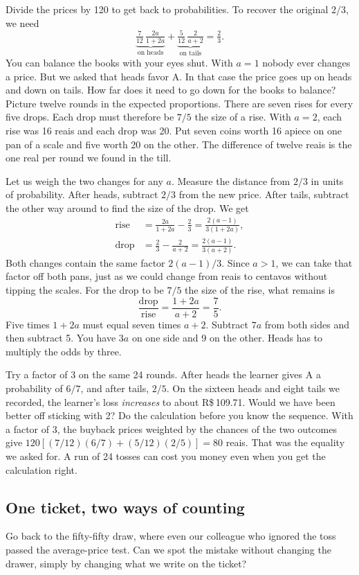\documentclass[12pt,oneside]{article}
\newcommand{\secao}[1]{\Needspace{5.2\baselineskip}\subsection*{#1}}
\begin{document}
Divide the prices by 120 to get back to probabilities. To recover the original $2/3$, we need
\[
\underbrace{\tfrac{7}{12}\,\tfrac{2a}{1+2a}}_{\text{on heads}}
+\underbrace{\tfrac{5}{12}\,\tfrac{2}{a+2}}_{\text{on tails}}
=\tfrac{2}{3}.
\]
You can balance the books with your eyes shut. With $a=1$ nobody ever changes a price. But we asked that heads favor A. In that case the price goes up on heads and down on tails. How far does it need to go down for the books to balance? Picture twelve rounds in the expected proportions. There are seven rises for every five drops. Each drop must therefore be $7/5$ the size of a rise. With $a=2$, each rise was 16 reais and each drop was 20. Put seven coins worth 16 apiece on one pan of a scale and five worth 20 on the other. The difference of twelve reais is the one real per round we found in the till.

Let us weigh the two changes for any $a$. Measure the distance from $2/3$ in units of probability. After heads, subtract $2/3$ from the new price. After tails, subtract the other way around to find the size of the drop. We get
\[
 \begin{aligned}
 \text{rise}&=\frac{2a}{1+2a}-\frac23=\frac{2(a-1)}{3(1+2a)},\\[4pt]
 \text{drop}&=\frac23-\frac{2}{a+2}=\frac{2(a-1)}{3(a+2)}.
 \end{aligned}
\]
Both changes contain the same factor $2(a-1)/3$. Since $a>1$, we can take that factor off both pans, just as we could change from reais to centavos without tipping the scales. For the drop to be $7/5$ the size of the rise, what remains is
\[
 \frac{\text{drop}}{\text{rise}}=\frac{1+2a}{a+2}=\frac75.
\]
Five times $1+2a$ must equal seven times $a+2$. Subtract $7a$ from both sides and then subtract 5. You have $3a$ on one side and 9 on the other. Heads has to multiply the odds by three.

Try a factor of 3 on the same 24 rounds. After heads the learner gives A a probability of $6/7$, and after tails, $2/5$. On the sixteen heads and eight tails we recorded, the learner's loss \emph{increases} to about R\$\,109.71. Would we have been better off sticking with 2? Do the calculation before you know the sequence. With a factor of 3, the buyback prices weighted by the chances of the two outcomes give $120[(7/12)(6/7)+(5/12)(2/5)]=80$ reais. That was the equality we asked for. A run of 24 tosses can cost you money even when you get the calculation right.

\secao{One ticket, two ways of counting}
Go back to the fifty-fifty draw, where even our colleague who ignored the toss passed the average-price test. Can we spot the mistake without changing the drawer, simply by changing what we write on the ticket?
\end{document}
